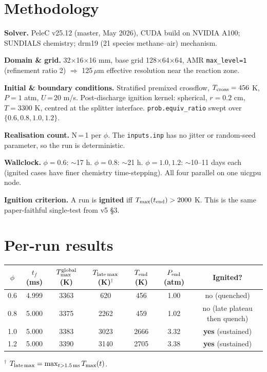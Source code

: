 \documentclass[11pt]{article}
\begin{document}
\section{Methodology}
\textbf{Solver.} PeleC v25.12 (master, May 2026), CUDA build on NVIDIA A100;
SUNDIALS chemistry; drm19 (21 species methane--air) mechanism.

\textbf{Domain \& grid.} 32\(\times\)16\(\times\)16 mm, base grid
128\(\times\)64\(\times\)64, AMR \texttt{max\_level=1} (refinement ratio 2)
\(\Rightarrow\) 125\,\(\mu\)m effective resolution near the reaction zone.

\textbf{Initial \& boundary conditions.} Stratified premixed crossflow,
\(T_{\rm cross}=456\) K, \(P=1\) atm, \(U\)\,=\,20 m/s. Post-discharge
ignition kernel: spherical, \(r=0.2\) cm, \(T=3300\) K, centred at the
splitter interface. \texttt{prob.equiv\_ratio} swept over
\(\{0.6,0.8,1.0,1.2\}\).

\textbf{Realisation count.} N\,=\,1 per \(\phi\). The \texttt{inputs.inp} has
no jitter or random-seed parameter, so the run is deterministic.

\textbf{Wallclock.} \(\phi\!=\!0.6\): \(\sim\)17 h. \(\phi\!=\!0.8\): \(\sim\)21 h.
\(\phi\!=\!1.0,1.2\): \(\sim\)10--11 days each (ignited cases have finer
chemistry time-stepping). All four parallel on one uicgpu node.

\textbf{Ignition criterion.} A run is \textbf{ignited} iff
\(T_{\max}(t_{\rm end}) > 2000\) K. This is the same paper-faithful
single-test from v5 \S3.

\section{Per-run results}

\begin{center}
\begin{tabular}{ccccccc}
\toprule
\(\phi\) & \(t_f\) (ms) & \(T_{\max}^{\rm global}\) (K) & \(T_{\rm late\,max}\) (K)\(^\dagger\) & \(T_{\rm end}\) (K) & \(P_{\rm end}\) (atm) & Ignited? \\
\midrule
0.6 & 4.999 & 3363 & 620  & 456  & 1.00 & no  (quenched) \\
0.8 & 5.000 & 3375 & 2262 & 459  & 1.02 & no  (late plateau then quench) \\
1.0 & 5.000 & 3383 & 3023 & 2666 & 3.32 & \textbf{yes} (sustained) \\
1.2 & 5.000 & 3390 & 3140 & 2705 & 3.38 & \textbf{yes} (sustained) \\
\bottomrule
\end{tabular}
\end{center}
\(^\dagger\) \(T_{\rm late\,max} = \max_{t > 1.5\,{\rm ms}} T_{\max}(t)\).
\end{document}
